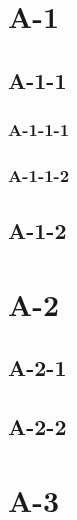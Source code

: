 \documentclass{book}
\begin{document}

\chapter{A-1}

\section{A-1-1}
\subsection{A-1-1-1}
\subsection{A-1-1-2}
\section{A-1-2}

\chapter{A-2}
\section{A-2-1}
\section{A-2-2}
\chapter{A-3}



\end{document}
